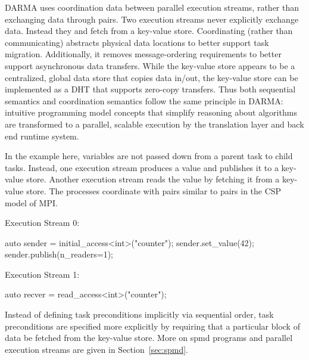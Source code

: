 \gls{DARMA} uses coordination data between parallel \glspl{execution stream},
rather than exchanging data through  pairs. 
Two \glspl{execution stream} never explicitly exchange data. Instead they
 and \gls{fetch} from a \gls{key-value store}.
Coordinating (rather than communicating) abstracts physical data locations to
better support \gls{task} migration.
Additionally, it removes message-ordering requirements to better support
\gls{asynchronous} data transfers.
While the \gls{key-value store} appears to be a centralized, global data store that copies data in/out,
the \gls{key-value store} can be implemented as a \gls{DHT} that supports
\gls{zero-copy} transfers.
Thus both \gls{sequential semantics} and \gls{coordination semantics} follow
the same principle in \gls{DARMA}: intuitive \gls{programming model}
concepts that simplify reasoning about algorithms are 
transformed to a parallel, scalable execution by the \gls{translation layer}
and \gls{back end} \gls{runtime system}.

In the example here, variables are not passed down from a \gls{parent task} to
\glspl{child task}.
Instead, one \gls{execution stream} produces a value and publishes it to a
\gls{key-value store}.
Another \gls{execution stream} reads the value by \gls{fetch}ing it from a
\gls{key-value store}.
The processes coordinate with  pairs similar to
 pairs in
the \gls{CSP} model of MPI.

\begin{minipage}{0.45\textwidth}
Execution Stream 0:
\begin{CppCode}
auto sender = initial_access<int>("counter");
sender.set_value(42);
sender.publish(n_readers=1);
\end{CppCode}
\end{minipage}
\begin{minipage}{0.45\textwidth}
Execution Stream 1:
\begin{CppCode}
auto recver = read_access<int>("counter");
\end{CppCode}
\end{minipage}

Instead of defining \gls{task} \glspl{precondition} implicitly via sequential order,
\gls{task} \glspl{precondition} are specified more explicitly by requiring that
a particular block of data be \gls{fetch}ed from the \gls{key-value store}.
More on \gls{spmd} programs and parallel \glspl{execution stream} are given in
Section~\ref{sec:spmd}.
